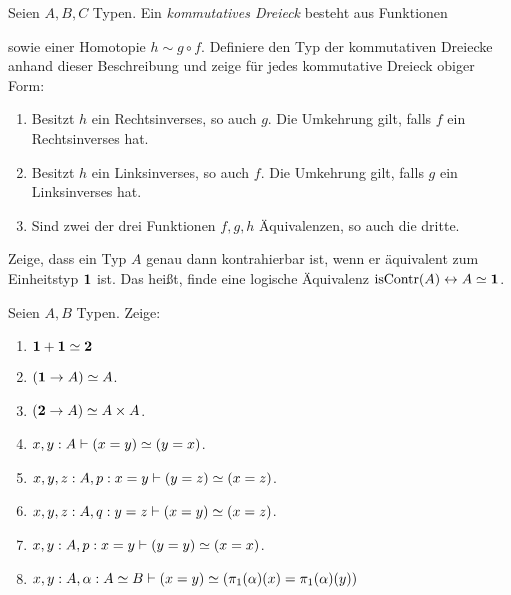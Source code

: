\documentclass{uebung}
\begin{document}

\begin{exercise}
  Seien $A,B,C$ Typen.
  Ein \emph{kommutatives Dreieck} besteht aus Funktionen
  \begin{center}
  \end{center}
  sowie einer Homotopie $h\sim g\circ f$.
  Definiere den Typ der kommutativen Dreiecke anhand dieser Beschreibung und zeige für jedes kommutative Dreieck obiger Form:
  \begin{enumerate}
    \item Besitzt $h$ ein Rechtsinverses, so auch $g$.
      Die Umkehrung gilt, falls $f$ ein Rechtsinverses hat.
    \item Besitzt $h$ ein Linksinverses, so auch $f$.
      Die Umkehrung gilt, falls $g$ ein Linksinverses hat.
    \item Sind zwei der drei Funktionen $f,g,h$ Äquivalenzen, so auch die dritte.
  \end{enumerate}
\end{exercise}

\begin{exercise}
  Zeige, dass ein Typ $A$ genau dann kontrahierbar ist, wenn er äquivalent zum Einheitstyp $\mathbf{1}$ ist.
  Das heißt, finde eine logische Äquivalenz $\mathrm{isContr}(A)\leftrightarrow A\simeq\mathbf{1}$.
\end{exercise}

\begin{exercise}
  Seien $A,B$ Typen.
  Zeige:
  \begin{multicols}{2}
    \begin{enumerate}
      \item $\mathbf{1}+\mathbf{1} \simeq \mathbf{2}$
      \item $(\mathbf{1} \to A)\simeq A$.
      \item $(\mathbf{2} \to A)\simeq A\times A$. 
      \item $x,y:A \vdash (x=y) \simeq (y=x)$.
      \item $x,y,z:A,p:x=y \vdash (y=z) \simeq (x=z)$.
      \item $x,y,z:A,q:y=z \vdash (x=y) \simeq (x=z)$.
      \item $x,y:A,p:x=y \vdash (y=y) \simeq (x=x)$.
      \item ${x,y:A, \alpha:A\simeq B \vdash (x=y) \simeq (\pi_1(\alpha)(x)=\pi_1(\alpha)(y))}$
    \end{enumerate}
  \end{multicols}
\end{exercise}
\end{document}
